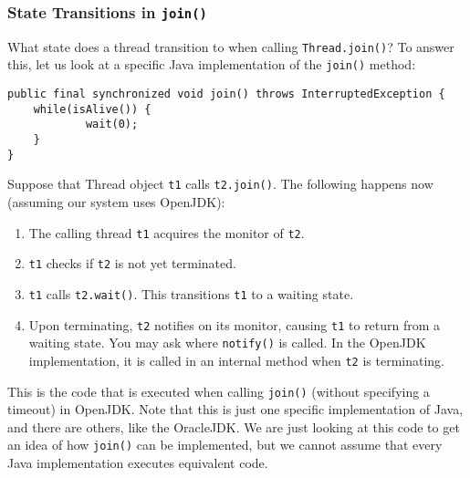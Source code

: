 \documentclass[main.tex]{subfiles}
\begin{document}
\subsubsection{State Transitions in \texttt{join()}}
What state does a thread transition to when calling \texttt{Thread.join()}? To answer this, let us look at a specific Java implementation of the \texttt{join()} method:
\begin{verbatim}
public final synchronized void join() throws InterruptedException {
    while(isAlive()) {
            wait(0);
    }
}
\end{verbatim}
Suppose that Thread object \texttt{t1} calls \texttt{t2.join()}. The following happens now (assuming our system uses OpenJDK):
\begin{enumerate}
    \item The calling thread \texttt{t1} acquires the monitor of \texttt{t2}.
    \item \texttt{t1} checks if \texttt{t2} is not yet terminated.
    \item \texttt{t1} calls \texttt{t2.wait()}. This transitions \texttt{t1} to a waiting state.
    \item Upon terminating, \texttt{t2} notifies on its monitor, causing \texttt{t1} to return from a waiting state. You may ask where \texttt{notify()} is called. In the OpenJDK implementation, it is called in an internal method when \texttt{t2} is terminating.
\end{enumerate}
This is the code that is executed when calling \texttt{join()} (without specifying a timeout) in OpenJDK. Note that this is just one specific implementation of Java, and there are others, like the OracleJDK. We are just looking at this code to get an idea of how \texttt{join()} can be implemented, but we cannot assume that every Java implementation executes equivalent code.

\end{document}
